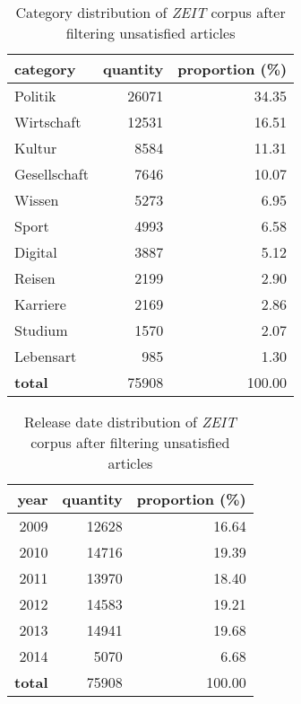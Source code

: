 \begin{table}[!htb]
\centering
\begin{tabular}{lrr}
\hline
\textbf{category} &   \textbf{quantity} &   \textbf{proportion (\%)} \\
\hline
Politik      &      26071 &            34.35 \\
Wirtschaft   &      12531 &            16.51 \\
Kultur       &       8584 &            11.31 \\
Gesellschaft &       7646 &            10.07 \\
Wissen       &       5273 &             6.95 \\
Sport        &       4993 &             6.58 \\
Digital      &       3887 &             5.12 \\
Reisen       &       2199 &             2.90 \\
Karriere     &       2169 &             2.86 \\
Studium      &       1570 &             2.07 \\
Lebensart    &        985 &             1.30 \\
\hline
\textbf{total}        &      75908 &           100.00 \\
\hline
\end{tabular}
\caption{Category distribution of \textit{ZEIT} corpus after filtering unsatisfied articles}
\label{tab:cate_dist_new}
\end{table}
\begin{table}[!htb]
\centering
\begin{tabular}{rrr}
\hline
\textbf{year} &   \textbf{quantity} &   \textbf{proportion (\%)} \\
\hline
2009 & 12628 &            16.64 \\
2010 & 14716 &            19.39 \\
2011 & 13970 &            18.40 \\
2012 & 14583 &            19.21 \\
2013 & 14941 &            19.68 \\
2014 &  5070 &             6.68 \\
\hline
\textbf{total} & 75908 &           100.00 \\
\hline
\end{tabular}
\caption{Release date distribution of \textit{ZEIT} corpus after filtering unsatisfied articles}
\label{tab:release_dist_new}
\end{table}

